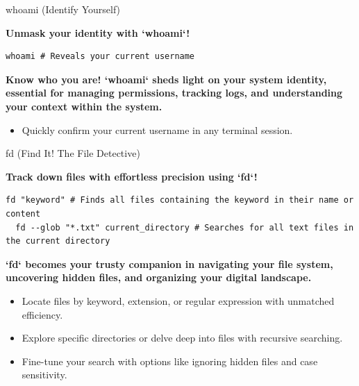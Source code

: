 \documentclass{beamer}
\begin{document}
\begin{frame}[fragile]{whoami (Identify Yourself)}

  \textbf{Unmask your identity with `whoami`!}

  \begin{lstlisting}[frame=none]
  whoami # Reveals your current username
  \end{lstlisting}

  \textbf{Know who you are! `whoami` sheds light on your system identity, essential for managing permissions, tracking logs, and understanding your context within the system.}

  \begin{itemize}
    \item Quickly confirm your current username in any terminal session.
  \end{itemize}
\end{frame}

\begin{frame}[fragile]{fd (Find It! The File Detective)}

  \textbf{Track down files with effortless precision using `fd`!}

  \begin{lstlisting}[frame=none]
  fd "keyword" # Finds all files containing the keyword in their name or content
  fd --glob "*.txt" current_directory # Searches for all text files in the current directory
  \end{lstlisting}

  \textbf{`fd` becomes your trusty companion in navigating your file system, uncovering hidden files, and organizing your digital landscape.}

  \begin{itemize}
    \item Locate files by keyword, extension, or regular expression with unmatched efficiency.
    \item Explore specific directories or delve deep into files with recursive searching.
    \item Fine-tune your search with options like ignoring hidden files and case sensitivity.
  \end{itemize}
\end{frame}
\end{document}
